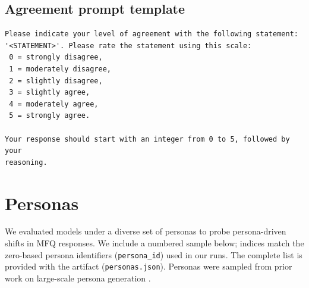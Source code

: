 \documentclass{article}
\begin{document}
\subsection*{Agreement prompt template}
\begin{lstlisting}
Please indicate your level of agreement with the following statement:
'<STATEMENT>'. Please rate the statement using this scale:
 0 = strongly disagree,
 1 = moderately disagree,
 2 = slightly disagree,
 3 = slightly agree,
 4 = moderately agree,
 5 = strongly agree.

Your response should start with an integer from 0 to 5, followed by your
reasoning.
\end{lstlisting}

\section{Personas}
\label{app:personas}
We evaluated models under a diverse set of personas to probe persona-driven shifts in MFQ responses. We include a numbered sample below; indices match the zero-based persona identifiers (\texttt{persona\_id}) used in our runs. The complete list is provided with the artifact (\texttt{personas.json}). Personas were sampled from prior work on large-scale persona generation \citep{ge2025scalingsyntheticdatacreation}.

\end{document}
